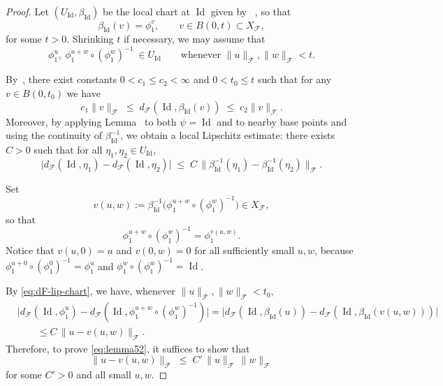 \documentclass[12pt]{amsart}
\numberwithin{equation}{section}
\theoremstyle{remark}
\begin{document}
\begin{proof}
Let $(U_{\operatorname{Id}},\beta_{\operatorname{Id}})$ be the local chart at $\operatorname{Id}$ given by
~, so that
\[
  \beta_{\operatorname{Id}}(v) = \phi_1^v,\qquad v\in B(0,t)\subset X_{\mathcal F},
\]
for some $t>0$. Shrinking $t$ if necessary, we may assume that
\[
  \phi_1^u,\ \phi_1^{u+w}\circ(\phi_1^w)^{-1}\ \in U_{\operatorname{Id}}
  \qquad\text{whenever } \|u\|_{\mathcal F},\|w\|_{\mathcal F}<t.
\]

By~, there exist constants $0<c_1\le c_2<\infty$ and
$0<t_0\le t$ such that for any $v\in B(0,t_0)$ we have
\begin{equation}\label{eq:dF-equiv}
  c_1\|v\|_{\mathcal F}
  \;\le\;
  d_{\mathcal F}(\operatorname{Id},\beta_{\operatorname{Id}}(v))
  \;\le\;
  c_2\|v\|_{\mathcal F}.
\end{equation}
Moreover, by applying Lemma~ to both $\psi=\operatorname{Id}$ and to nearby
base points and using the continuity of $\beta_{\operatorname{Id}}^{-1}$, we obtain
a local Lipschitz estimate: there exists $C>0$ such that for
all $\eta_1,\eta_2\in U_{\operatorname{Id}}$,
\begin{equation}\label{eq:dF-lip-chart}
  \bigl|d_{\mathcal F}(\operatorname{Id},\eta_1)-d_{\mathcal F}(\operatorname{Id},\eta_2)\bigr|
  \;\le\;
  C\,\bigl\|\beta_{\operatorname{Id}}^{-1}(\eta_1)-\beta_{\operatorname{Id}}^{-1}(\eta_2)\bigr\|_{\mathcal F}.
\end{equation}

Set
\[
  v(u,w)
  :=
  \beta_{\operatorname{Id}}^{-1}\bigl(\phi_1^{u+w}\circ(\phi_1^{w})^{-1}\bigr)
  \in X_{\mathcal F},
\]
so that
\[
  \phi_1^{u+w}\circ(\phi_1^{w})^{-1}=\phi_1^{v(u,w)}.
\]
Notice that $v(u,0)=u$ and $v(0,w)=0$ for all sufficiently small
$u,w$, because $\phi_1^{u+0}\circ(\phi_1^0)^{-1}=\phi_1^u$ and
$\phi_1^w\circ(\phi_1^w)^{-1}=\operatorname{Id}$.

By \eqref{eq:dF-lip-chart}, we have, whenever
$\|u\|_{\mathcal F},\|w\|_{\mathcal F}<t_0$,
\begin{equation}\label{eq:dF-reduced}
\begin{aligned}
  &\bigl|d_{\mathcal F}(\operatorname{Id},\phi_1^u)
        -d_{\mathcal F}(\operatorname{Id},\phi_1^{u+w}\circ(\phi_1^{w})^{-1})\bigr|
   = \bigl|d_{\mathcal F}(\operatorname{Id},\beta_{\operatorname{Id}}(u))
          -d_{\mathcal F}(\operatorname{Id},\beta_{\operatorname{Id}}(v(u,w)))\bigr| \\
  &\qquad\le
   C\,\|u-v(u,w)\|_{\mathcal F}.
\end{aligned}
\end{equation}
Therefore, to prove \eqref{eq:lemma52}, it suffices to show that
\begin{equation}\label{eq:v-uv-est}
  \|u-v(u,w)\|_{\mathcal F}
  \;\le\; C'\,\|u\|_{\mathcal F}\,\|w\|_{\mathcal F}
\end{equation}
for some $C'>0$ and all small $u,w$.


\end{proof}
\end{document}
